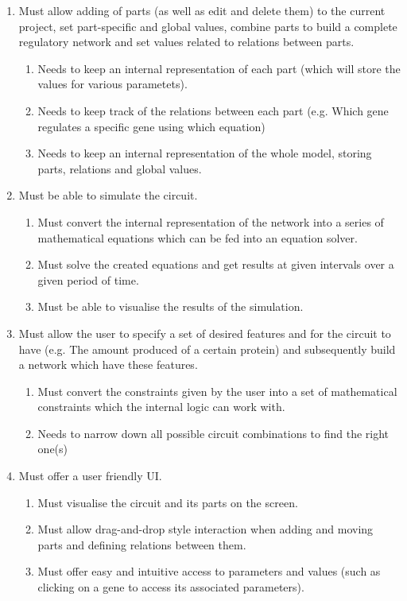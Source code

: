 \documentclass{article}
\begin{document}
		\begin{enumerate}
			\item Must allow adding of parts (as well as edit and delete them) to the current project, set part-specific and global values, combine parts to build a complete regulatory network and set values related to relations between parts.
			\begin{enumerate}
				\item Needs to keep an internal representation of each part (which will store the values for various parametets).
				\item Needs to keep track of the relations between each part (e.g. Which gene regulates a specific gene using which equation)
				\item Needs to keep an internal representation of the whole model, storing parts, relations and global values.	
			\end{enumerate}
		
			\item Must be able to simulate the circuit.
			\begin{enumerate}
				\item Must convert the internal representation of the network into a series of mathematical equations which can be fed into an equation solver.
				\item Must solve the created equations and get results at given intervals over a given period of time.
				\item Must be able to visualise the results of the simulation.
			\end{enumerate}
			
			\item Must allow the user to specify a set of desired features and for the circuit to have (e.g. The amount produced of a certain protein) and subsequently build a network which have these features.
			\begin{enumerate}
				\item Must convert the constraints given by the user into a set of mathematical constraints which the internal logic can work with.
				\item Needs to narrow down all possible circuit combinations to find the right one(s) 
			\end{enumerate}
	
			\item Must offer a user friendly UI.
			\begin{enumerate}
				\item Must visualise the circuit and its parts on the screen.
				\item Must allow drag-and-drop style interaction when adding and moving parts and defining relations between them.
				\item Must offer easy and intuitive access to parameters and values (such as clicking on a gene to access its associated parameters).
			\end{enumerate}
		

\end{enumerate}
\end{document}
